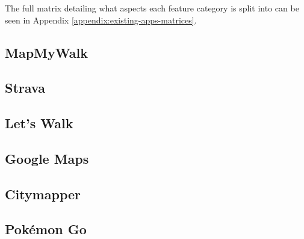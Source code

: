 The full matrix detailing what aspects each feature category is split into can be seen in Appendix \ref{appendix:existing-apps-matrices}.


\subsection{MapMyWalk}

\subsection{Strava}

\subsection{Let's Walk}

\subsection{Google Maps}

\subsection{Citymapper}

\subsection{Pok\'{e}mon Go}






%
%
%
%
